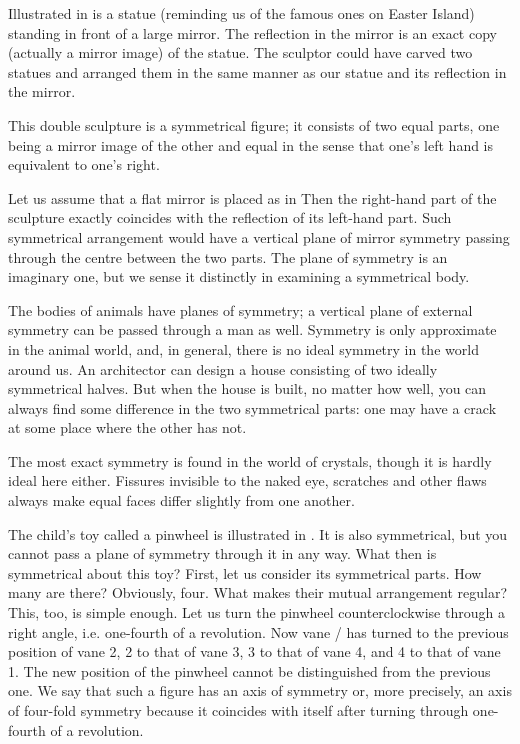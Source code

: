 Illustrated in  is a statue (reminding us of the famous ones on Easter Island) standing in front of a large mirror. The reflection in the mirror is an exact copy (actually a mirror image) of the statue. The sculptor could have carved two statues and arranged them in the same manner as our statue and its reflection in the mirror.

This double sculpture is a symmetrical figure; it consists of two equal parts, one being a mirror image of the other and equal in the sense that one’s left hand is equivalent to one’s right.

Let us assume that a flat mirror is placed as in  Then the right-hand part of the sculpture exactly coincides with the reflection of its left-hand part. Such symmetrical arrangement would have a vertical plane of mirror symmetry passing through the centre between the two parts. The plane of symmetry is an imaginary one, but we sense it distinctly in examining a symmetrical body.

The bodies of animals have planes of symmetry; a ver­tical plane of external symmetry can be passed through a man as well. Symmetry is only approximate in the animal world, and, in general, there is no ideal symmetry in the world around us. An architector can design a house consisting of two ideally symmetrical halves. But when the house is built, no matter how well, you can always find some difference in the two symmetrical parts: one may have a crack at some place where the other has not.

The most exact symmetry is found in the world of crystals, though it is hardly ideal here either. Fissures invisible to the naked eye, scratches and other flaws always make equal faces differ slightly from one another.

The child’s toy called a pinwheel is illustrated in . It is also symmetrical, but you cannot pass a plane of symmetry through it in any way. What then is symmetrical about this toy? First, let us consider its symmetrical parts. How many are there? Obviously, four. What makes their mutual arrangement regular? This, too, is simple enough. Let us turn the pinwheel counterclockwise through a right angle, i.e. one-fourth of a revolution. Now vane / has turned to the previous position of vane 2, 2 to that of vane 3, 3 to that of vane 4, and 4 to that of vane 1. The new position of the pinwheel cannot be distinguished from the previous one. We say that such a figure has an axis of symmetry or, more pre­cisely, an axis of four-fold symmetry because it coincides with itself after turning through one-fourth of a revolu­tion.

